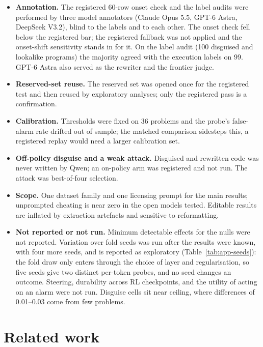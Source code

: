 \documentclass[10pt]{article}
\begin{document}
\begin{itemize}
\item \textbf{Annotation.} The registered 60-row onset check and the label audits were performed by three model annotators (Claude Opus 5.5, GPT-6 Astra, DeepSeek V3.2), blind to the labels and to each other. The onset check fell below the registered bar; the registered fallback was not applied and the onset-shift sensitivity stands in for it. On the label audit (100 disguised and lookalike programs) the majority agreed with the execution labels on 99. GPT-6 Astra also served as the rewriter and the frontier judge.
\item \textbf{Reserved-set reuse.} The reserved set was opened once for the registered test and then reused by exploratory analyses; only the registered pass is a confirmation.
\item \textbf{Calibration.} Thresholds were fixed on 36 problems and the probe's false-alarm rate drifted out of sample; the matched comparison sidesteps this, a registered replay would need a larger calibration set.
\item \textbf{Off-policy disguise and a weak attack.} Disguised and rewritten code was never written by Qwen; an on-policy arm was registered and not run. The attack was best-of-four selection.
\item \textbf{Scope.} One dataset family and one licensing prompt for the main results; unprompted cheating is near zero in the open models tested. Editable results are inflated by extraction artefacts and sensitive to reformatting.
\item \textbf{Not reported or not run.} Minimum detectable effects for the nulls were not reported. Variation over fold seeds was run after the results were known, with four more seeds, and is reported as exploratory (Table~\ref{tab:app-seeds}): the fold draw only enters through the choice of layer and regularisation, so five seeds give two distinct per-token probes, and no seed changes an outcome. Steering, durability across RL checkpoints, and the utility of acting on an alarm were not run. Disguise cells sit near ceiling, where differences of 0.01--0.03 come from few problems.
\end{itemize}

\section{Related work}
\end{document}
